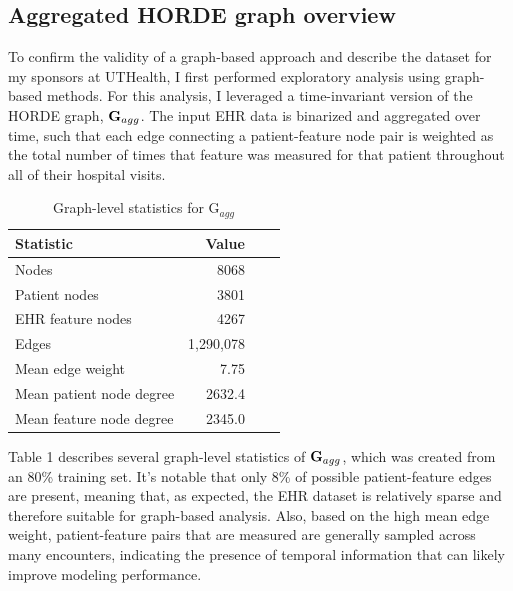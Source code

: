 \documentclass{article}
\begin{document}
\subsection{Aggregated HORDE graph overview}
To confirm the validity of a graph-based approach and describe the dataset for my sponsors at UTHealth, I first performed exploratory analysis using graph-based methods. For this analysis, I leveraged a time-invariant version of the HORDE graph, ${\textbf G_{agg}}$. The input EHR data is binarized and aggregated over time, such that each edge connecting a patient-feature node pair is weighted as the total number of times that feature was measured for that patient throughout all of their hospital visits.
\begin{table}
    \caption{
      Graph-level statistics for G$_{agg}$
    }
    \label{tab:exp}
    \centering
    \centering
    \label{tab:exp-synth}
    \begin{small}
    \begin{sc}
    \begin{tabular}{lrrr}
    \toprule
    Statistic                       & Value \\
    \midrule
    Nodes                         & 8068 \\
    Patient nodes                         & 3801 \\
    EHR feature nodes                         & 4267     \\
    Edges                            & 1,290,078    \\
    Mean edge weight                                  & 7.75 \\
    Mean patient node degree              & 2632.4    \\
    Mean feature node degree                   & 2345.0    \\
    \bottomrule
    \end{tabular}
    \end{sc}
    \end{small}
\end{table}

Table 1 describes several graph-level statistics of ${\textbf G_{agg}}$, which was created from an 80\% training set. It’s notable that only 8\% of possible patient-feature edges are present, meaning that, as expected, the EHR dataset is relatively sparse and therefore suitable for graph-based analysis. Also, based on the high mean edge weight, patient-feature pairs that are measured are generally sampled across many encounters, indicating the presence of temporal information that can likely improve modeling performance.
\end{document}
